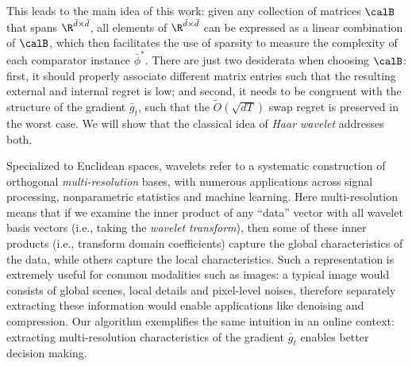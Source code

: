 \documentclass[10pt]{article}
\begin{document}
This leads to the main idea of this work: given any collection of matrices $\calB$ that spans $\R^{\bar d\times\bar d}$, all elements of $\R^{\bar d\times\bar d}$ can be expressed as a linear combination of $\calB$, which then facilitates the use of sparsity to measure the complexity of each comparator instance $\bar\phi^*$. There are just two desiderata when choosing $\calB$: first, it should properly associate different matrix entries such that the resulting external and internal regret is low; and second, it needs to be congruent with the structure of the gradient $\bar g_t$, such that the $\tilde O(\sqrt{dT})$ swap regret is preserved in the worst case. We will show that the classical idea of \emph{Haar wavelet} \citep{mallat2008wavelet} addresses both. 

Specialized to Euclidean spaces, wavelets refer to a systematic construction of orthogonal \emph{multi-resolution} bases, with numerous applications across signal processing, nonparametric statistics and machine learning. Here multi-resolution means that if we examine the inner product of any ``data'' vector with all wavelet basis vectors (i.e., taking the \emph{wavelet transform}), then some of these inner products (i.e., transform domain coefficients) capture the global characteristics of the data, while others capture the local characteristics. Such a representation is extremely useful for common modalities such as images: a typical image would consists of global scenes, local details and pixel-level noises, therefore separately extracting these information would enable applications like denoising and compression. Our algorithm exemplifies the same intuition in an online context: extracting multi-resolution characteristics of the gradient $\bar g_t$ enables better decision making. 
\end{document}
